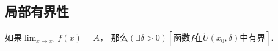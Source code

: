 \subsection{局部有界性}
\begin{corollary}[局部有界性]\label{theorem:极限.函数极限的局部有界性}
如果\(\lim_{x \to x_0} f(x) = A\)，
那么\((\exists\delta>0)[\text{函数$f$在$\mathring{U}(x_0,\delta)$中有界}]\).
\end{corollary}





